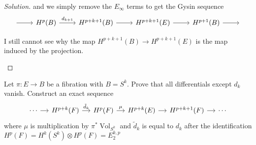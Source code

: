 \begin{proof}[Solution]
	and we simply remove the $E_{\infty}$ terms to get the Gysin sequence
	\[\begin{tikzcd}\leavevmode \arrow[r]&H^{p}(B)\arrow[r,"d_{k+1}"]&H^{p+k+1}(B)\arrow[r]&H^{p+k+1}(E)\arrow[r]&H^{p+1}(B)\arrow[r]&\leavevmode\end{tikzcd}\]
	\begin{remark}
		I still cannot see why the map $H^{p+k+1}(B)\to H^{p+k+1}(E)$ is the map induced by the projection.
	\end{remark}
\end{proof}

\begin{manualexercise}{2.11}
	Let $\pi:E\to B$ be a fibration with $B=S^k$. Prove that all differentials except $d_k$ vanish. Construct an exact sequence
	\[\begin{tikzcd}[column sep=small]
		\cdots\arrow[r]&H^{p+k}(F)\arrow[r,"\tilde{d}_k"]&H^{p}(F)\arrow[r,"\mu"]&H^{p+k}(E)\arrow[r]&H^{p+k+1}(F)\arrow[r]&\cdots
	\end{tikzcd}\]
	where $\mu$ is multiplication by $\pi^*\operatorname{Vol}_{S^k}$ and $\tilde{d}_{k}$ is equal to $d_k$ after the identification $H^{p}(F)=H^{k}(S^k)\otimes H^{p}(F)=E^{k,p}_2$
\end{manualexercise}

